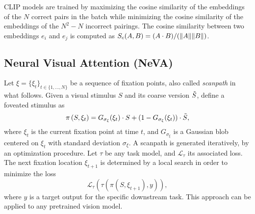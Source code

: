 \documentclass{article}
\DeclarePairedDelimiter{\norm}{\lVert}{\rVert}
\begin{document}
CLIP models are trained by maximizing the cosine similarity of the embeddings of the $N$ correct pairs in the batch while minimizing the cosine similarity of the embeddings of the $N^2-N$ incorrect pairings. The cosine similarity between two embeddings $e_i$ and $e_j$ is computed as $S_c(A, B) = (A \cdot B) / (\norm{A} \norm{B})$.

\subsection{Neural Visual Attention (NeVA)}
Let $\xi = \{\xi_t\}_{t \in \{1, ..., N\}}$ be a sequence of fixation points, also called \textit{scanpath} in what follows. Given a visual stimulus $S$ and its coarse version $\Tilde{S}$, \citet{schwinn2022behind} define a foveated stimulus as $$\pi \left(S, \xi_t \right) = G_{\sigma_\xi}(\xi_t) \cdot S + (1-G_{\sigma_\xi}(\xi_t)) \cdot \Tilde{S},$$ 
where $\xi_t$ is the current fixation point at time $t$, and $G_{\sigma_\xi}$ is a Gaussian blob centered on $\xi_t$ with standard deviation $\sigma_\xi$. A scanpath is generated iteratively, by an optimization procedure. Let $\tau$ be any task model, and $\mathcal{L}_{\tau}$ its associated loss. The next fixation location $\xi_{t+1}$ is determined by a local search in order to minimize the loss 
$$\mathcal{L}_{\tau} (\tau(\pi \left(S, \xi_{t+1} \right), y)), $$
where $y$ is a target output for the specific downstream task. This approach can be applied to any pretrained vision model.
\end{document}
